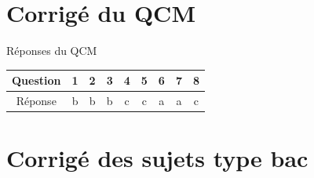 \documentclass[11pt,a4paper]{article}
\renewcommand{\arraystretch}{1.13}
\begin{document}
\section{Corrigé du QCM}
\begin{correctionbox}{Réponses du QCM}
\begin{center}
\renewcommand{\arraystretch}{1.25}
\begin{tabular}{c|cccccccc}
Question & 1&2&3&4&5&6&7&8\\\hline
Réponse & b&b&b&c&c&a&a&c\\
\end{tabular}
\end{center}
\end{correctionbox}

\section{Corrigé des sujets type bac}
\end{document}
